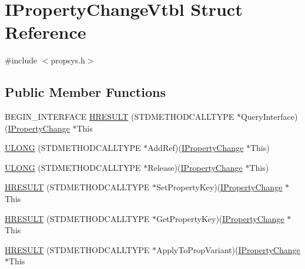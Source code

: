 \hypertarget{struct_i_property_change_vtbl}{}\section{I\+Property\+Change\+Vtbl Struct Reference}
\label{struct_i_property_change_vtbl}


{\ttfamily \#include $<$propsys.\+h$>$}

\subsection*{Public Member Functions}
\begin{DoxyCompactItemize}
\item 
B\+E\+G\+I\+N\+\_\+\+I\+N\+T\+E\+R\+F\+A\+CE \hyperlink{struct_i_property_change_vtbl_aab299d9615b9d17e2ae86d8c200308cb}{H\+R\+E\+S\+U\+LT} (S\+T\+D\+M\+E\+T\+H\+O\+D\+C\+A\+L\+L\+T\+Y\+PE $\ast$Query\+Interface)(\hyperlink{propsys_8h_a674e8d93a47417184f77a8ff344d67c5}{I\+Property\+Change} $\ast$This
\item 
\hyperlink{struct_i_property_change_vtbl_a05d41ecd8d1425454bce0aab6c9a2861}{U\+L\+O\+NG} (S\+T\+D\+M\+E\+T\+H\+O\+D\+C\+A\+L\+L\+T\+Y\+PE $\ast$Add\+Ref)(\hyperlink{propsys_8h_a674e8d93a47417184f77a8ff344d67c5}{I\+Property\+Change} $\ast$This)
\item 
\hyperlink{struct_i_property_change_vtbl_adb9d92b7275cb4f195f4705c85972450}{U\+L\+O\+NG} (S\+T\+D\+M\+E\+T\+H\+O\+D\+C\+A\+L\+L\+T\+Y\+PE $\ast$Release)(\hyperlink{propsys_8h_a674e8d93a47417184f77a8ff344d67c5}{I\+Property\+Change} $\ast$This)
\item 
\hyperlink{struct_i_property_change_vtbl_a098b6a91a6c3eab50dab8d59b437f57f}{H\+R\+E\+S\+U\+LT} (S\+T\+D\+M\+E\+T\+H\+O\+D\+C\+A\+L\+L\+T\+Y\+PE $\ast$Set\+Property\+Key)(\hyperlink{propsys_8h_a674e8d93a47417184f77a8ff344d67c5}{I\+Property\+Change} $\ast$This
\item 
\hyperlink{struct_i_property_change_vtbl_ad29fd3a0f88e7647a67f10d8ba5311b6}{H\+R\+E\+S\+U\+LT} (S\+T\+D\+M\+E\+T\+H\+O\+D\+C\+A\+L\+L\+T\+Y\+PE $\ast$Get\+Property\+Key)(\hyperlink{propsys_8h_a674e8d93a47417184f77a8ff344d67c5}{I\+Property\+Change} $\ast$This
\item 
\hyperlink{struct_i_property_change_vtbl_a81aa07e3d57167b2901b414fca30824f}{H\+R\+E\+S\+U\+LT} (S\+T\+D\+M\+E\+T\+H\+O\+D\+C\+A\+L\+L\+T\+Y\+PE $\ast$Apply\+To\+Prop\+Variant)(\hyperlink{propsys_8h_a674e8d93a47417184f77a8ff344d67c5}{I\+Property\+Change} $\ast$This
\end{DoxyCompactItemize}
